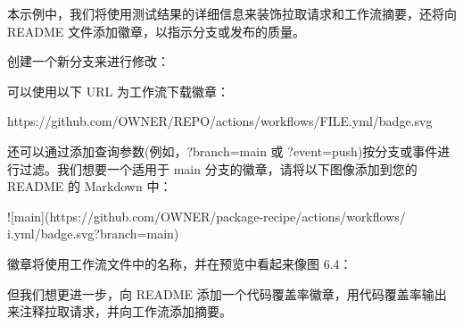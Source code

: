 
本示例中，我们将使用测试结果的详细信息来装饰拉取请求和工作流摘要，还将向 README 文件添加徽章，以指示分支或发布的质量。


创建一个新分支来进行修改：



可以使用以下 URL 为工作流下载徽章：

\begin{shell}
https://github.com/OWNER/REPO/actions/workflows/FILE.yml/badge.svg
\end{shell}

还可以通过添加查询参数(例如，?branch=main 或 ?event=push)按分支或事件进行过滤。我们想要一个适用于 main 分支的徽章，请将以下图像添加到您的 README 的 Markdown 中：

\begin{shell}
![main](https://github.com/OWNER/package-recipe/actions/workflows/ i.yml/badge.svg?branch=main)
\end{shell}

徽章将使用工作流文件中的名称，并在预览中看起来像图 6.4：


但我们想更进一步，向 README 添加一个代码覆盖率徽章，用代码覆盖率输出来注释拉取请求，并向工作流添加摘要。

